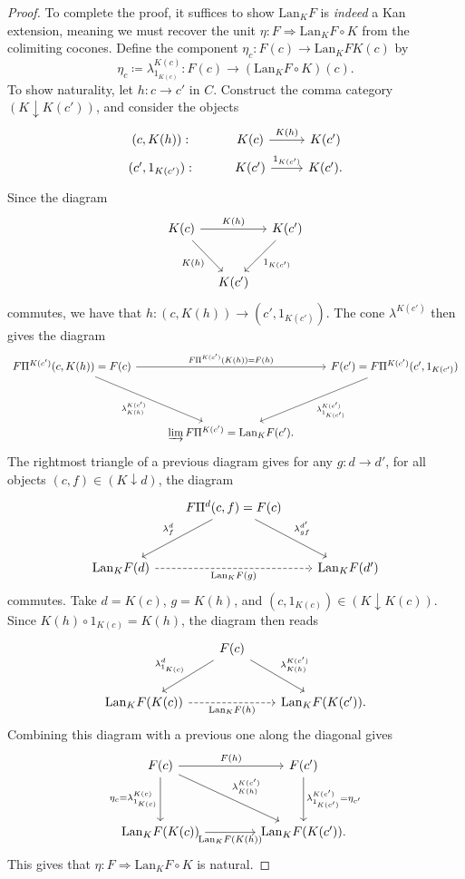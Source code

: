\begin{proof}
	To complete the proof, it suffices to show $\mathrm{Lan} _KF$ is \emph{indeed} a Kan extension, meaning we must recover the unit $\eta : F \Rightarrow \mathrm{Lan} _KF\circ K$ from the colimiting cocones. Define the component $\eta_c : F(c) \to \mathrm{Lan} _KFK(c)$ by
	\[
		\eta_c \coloneqq \lambda^{K(c)} _{1_{K(c)} } : F(c) \to \left( \mathrm{Lan} _KF\circ K \right) (c)
	.\]
	To show naturality, let $h : c \to c'$ in $C$. Construct the comma category $(K\downarrow K(c'))$, and consider the objects
	\[\begin{tikzcd}[row sep = 0.5em, column sep = 2.5em]
		(c,K(h)): & K(c)\ar[" K(h) ", r]  & K(c') \\
	(c',1_{K(c')} ): & K(c')\ar[" 1_{K(c')}  ", r]  & K(c').
	\end{tikzcd}\]
	Since the diagram
	\[\begin{tikzcd}[row sep = 2.5em, column sep = 1em]
	K(c)\ar[" K(h) ", rr] \ar[" K(h) "', dr]  &  & K(c')\ar[" 1_{K(c')}  ", dl]  \\
	 & K(c') & 
	\end{tikzcd}\]
	commutes, we have that $h : (c,K(h)) \to (c',1_{K(c')} )$. The cone $\lambda^{K(c')} $ then gives the diagram
	\[\begin{tikzcd}[row sep = 4em, column sep = 2.5em]
	F\Pi^{K(c')} (c,K(h))=F(c) \ar[" F\Pi^{K(c')} (K(h))=F(h) ", rr] \ar[" \lambda^{K(c')}_{K(h)}  "', dr]  &  & F(c')=F\Pi^{K(c')} (c',1_{K(c')} )\ar[" \lambda_{1_{K(c')} } ^{K(c')}  ", dl]  \\
	 & \varinjlim F\Pi^{K(c')} =\mathrm{Lan}_{K} F(c'). & 
	\end{tikzcd}\]
	The rightmost triangle of a previous diagram gives for any $g : d \to d'$, for all objects $(c,f)\in(K\downarrow d)$, the diagram
	\[\begin{tikzcd}[row sep = 3em, column sep = 2em]
	 & F\Pi^d(c,f)=F(c) \ar[" \lambda^{d'}_{gf}  ", dr] \ar[" \lambda^d_f "', dl]  &  \\
	\mathrm{Lan}_KF(d)\ar[" \mathrm{Lan} _KF(g) "', dashed, rr]  &  & \mathrm{Lan} _KF(d')
	\end{tikzcd}\]
	commutes. Take $d=K(c)$, $g=K(h) $, and $(c,1_{K(c)} )\in (K\downarrow K(c))$. Since $K(h)\circ 1_{K(c)} =K(h)$, the diagram then reads
	\[\begin{tikzcd}[row sep = 2.5em, column sep = 2em]
	 & F(c)\ar[" \lambda^{K(c')}_{K(h)}  ", dr] \ar[" \lambda^d_{1_{K(c)} }  "', dl]  &  \\
	\mathrm{Lan} _KF(K(c))\ar[" \mathrm{Lan} _KF(h) "', dashed, rr]  &  & \mathrm{Lan} _KF(K(c')).
	\end{tikzcd}\]
	Combining this diagram with a previous one along the diagonal gives
	\[\begin{tikzcd}[row sep = 3.5em, column sep = 4em]
	F(c)\ar[" F(h) ", r] \ar["\eta_c=\lambda_{1_{K(c)} } ^{K(c)}  "', d] \ar[" \lambda_{K(h)}^{K(c')}  ", dr]  & F(c')\ar[" \lambda_{1_{K(c')} } ^{K(c')}=\eta_{c'}  ", d]  \\
	\mathrm{Lan} _KF(K(c))\ar[" \mathrm{Lan} _KF(K(h)) "', r]  & \mathrm{Lan} _KF(K(c')).
	\end{tikzcd}\]
	This gives that $\eta : F \Rightarrow \mathrm{Lan} _KF\circ K$ is natural.


\end{proof}
